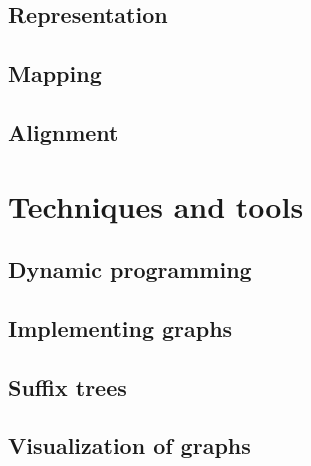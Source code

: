 \documentclass[thesis.tex]{subfiles}
\begin{document}
\subsection{Representation}
\subsection{Mapping}
\subsection{Alignment}
\section{Techniques and tools}
\subsection{Dynamic programming}
\subsection{Implementing graphs}
\subsection{Suffix trees}
\subsection{Visualization of graphs}
\end{document}
